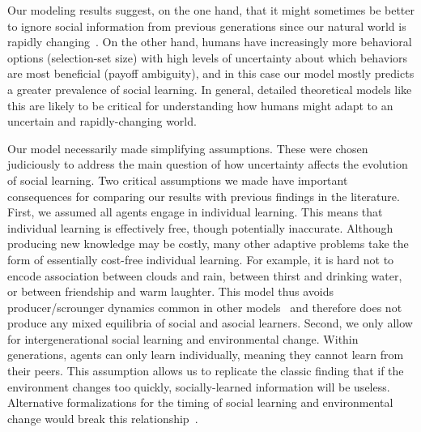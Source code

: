 \documentclass[letterpaper,11.5pt]{scrartcl}
\newcommand{\mt}[1]{{\textcolor{myorange} {({\tiny MT:} #1)}}}
\newcommand{\cm}[1]{{\textcolor{mypurple} {({\tiny CM:} #1)}}}
\begin{document}
Our modeling results suggest, on the one hand, that it might sometimes be better to
ignore social information from previous generations since our natural world is
rapidly changing~\citep[e.g.,][]{IPCC2022}. On the other hand, humans have increasingly more behavioral options (selection-set size) with high levels of uncertainty about which behaviors are most beneficial (payoff ambiguity), and in this case our model mostly predicts a greater prevalence of social learning.
In general, detailed theoretical models like this are likely to be critical for understanding how humans might adapt to an uncertain and rapidly-changing world.

Our model necessarily made simplifying assumptions. These were chosen judiciously to address the main question of how uncertainty
affects the evolution of social learning. Two critical assumptions we made have important consequences for comparing our results
with previous findings in the literature. First, we assumed all agents engage in individual learning. This means that individual learning is effectively free, though
potentially inaccurate. Although producing new knowledge may be costly, many other adaptive problems take the form of essentially
cost-free individual learning. For example, it is hard not to encode association between clouds and rain, between thirst and
drinking water, or between friendship and warm laughter. This model thus avoids producer/scrounger dynamics common in other
models~\citep{BoydRicherson1985,Rogers1988} and therefore does not produce any mixed equilibria of social and asocial learners.
Second, we only allow for intergenerational social learning and environmental change. Within generations, agents can only learn
individually, meaning they cannot learn from their peers. This
assumption allows us to replicate the classic finding that if the environment changes too quickly, socially-learned information will be useless. Alternative formalizations for the timing of social learning and environmental change would break this relationship~\citep{Turner2022}. 
\end{document}
